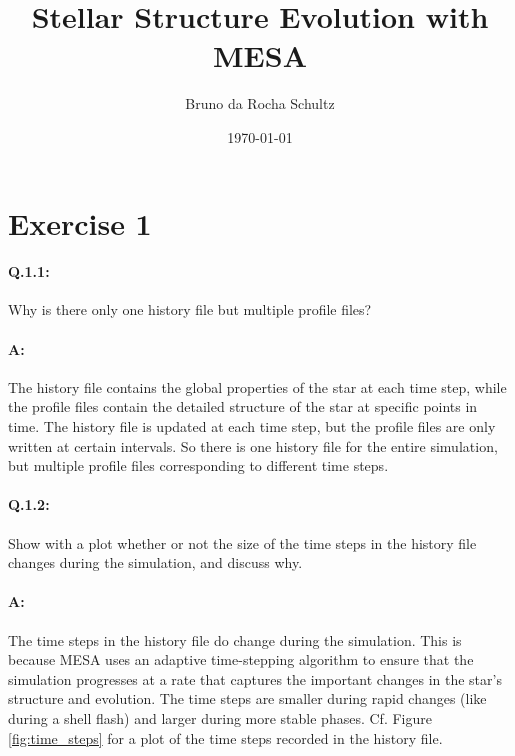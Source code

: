 \documentclass[twocolumn,fontsize=11pt]{scrartcl}
\title{\vspace{-1cm}Stellar Structure Evolution with MESA}
\author{Bruno da Rocha Schultz}
\date{\today}
\begin{document}
\maketitle

\section*{Exercise 1}

\paragraph{Q.1.1:} Why is there only one history file but multiple profile files?

\paragraph{A:} The history file contains the global properties of the star at each time step, while the profile files contain the detailed structure of the star at specific points in time. The history file is updated at each time step, but the profile files are only written at certain intervals. So there is one history file for the entire simulation, but multiple profile files corresponding to different time steps.

\paragraph{Q.1.2:} Show with a plot whether or not the size of the time steps in the history file changes
during the simulation, and discuss why.

\paragraph{A:} The time steps in the history file do change during the simulation. This is because MESA uses an adaptive time-stepping algorithm to ensure that the simulation progresses at a rate that captures the important changes in the star's structure and evolution. The time steps are smaller during rapid changes (like during a shell flash) and larger during more stable phases. Cf. Figure \ref{fig:time_steps} for a plot of the time steps recorded in the history file. 
\end{document}
